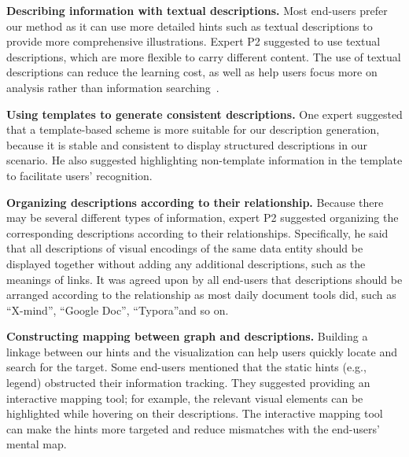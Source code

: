 \begin{compactenum}[\textbf{D}1]
    \item {\bf Describing information with textual descriptions.} Most end-users prefer our method as it can use more detailed hints such as textual descriptions to provide more comprehensive illustrations. 
    Expert P2 suggested to use textual descriptions, which are more flexible to carry different content.
    The use of textual descriptions can reduce the learning cost, as well as help users focus more on analysis rather than information searching~\cite{DBLP:journals/tochi/FerresLST13, DBLP:conf/inlg/ObeidH20, DBLP:conf/apvis/LiuXHWY20}. 
    
    \item {\bf Using templates to generate consistent descriptions.} One expert suggested that a template-based scheme is more suitable for our description generation, because it is stable and consistent to display structured descriptions in our scenario. He also suggested highlighting non-template information in the template to facilitate users' recognition.
    
    \item {\bf Organizing descriptions according to their relationship.} Because there may be several different types of information, expert P2 suggested organizing the corresponding descriptions according to their relationships. Specifically, he said that all descriptions of visual encodings of the same data entity should be displayed together without adding any additional descriptions, such as the meanings of links. It was agreed upon by all end-users that descriptions should be arranged according to the relationship as most daily document tools did, such as ``X-mind'', ``Google Doc'', ``Typora''and so on.
    
    \item {\bf Constructing mapping between graph and descriptions.} Building a linkage between our hints and the visualization can help users quickly locate and search for the target. Some end-users mentioned that the static hints (e.g., legend) obstructed their information tracking. They suggested providing an interactive mapping tool; for example, the relevant visual elements can be highlighted while hovering on their descriptions. The interactive mapping tool can make the hints more targeted and reduce mismatches with the end-users’ mental map.
\end{compactenum}

